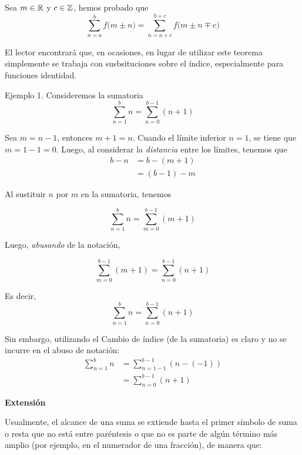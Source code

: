 Sea $m\in \mathbb{R}$ y $c\in \mathbb{Z}$, hemos probado que \[\sum_{n=a}^{b}f\bigl(m\pm n\bigr) = \sum_{n=a+c}^{b+c}f\bigl(m\pm n \mp c\bigr)\]

El lector encontrará que, en ocasiones, en lugar de utilizar este teorema simplemente se trabaja con susbsituciones sobre el índice, especialmente para funciones identidad. 

Ejemplo 1. Consideremos la sumatoria
  \[\sum_{n=1}^{b} n = \sum_{n=0}^{b-1} (n+1)\]
  
  Sea $m=n-1$, entonces $m+1=n$. Cuando el límite inferior $n=1$, se tiene que $m=1-1=0$. Luego, al considerar la \textit{distancia} entre los límites, tenemos que
  \begin{align*}
    b - n &= b - (m+1)\\
    &= (b-1) - m
  \end{align*}
  
  Al sustituir $n$ por $m$ en la sumatoria, tenemos
  
  \[\sum_{n=1}^{b} n = \sum_{m=0}^{b-1} (m+1)\]
  
  Luego, \textit{abusando} de la notación, 
  
  \[\sum_{m=0}^{b-1} (m+1) = \sum_{n=0}^{b-1} (n+1)\]
  
  Es decir, \[\sum_{n=1}^{b} n = \sum_{n=0}^{b-1} (n+1)\]
  
  Sin embargo, utilizando el Cambio de índice (de la sumatoria) es claro y no se incurre en el abuso de notación:
  \begin{align*}
    \sum_{n=1}^{b} n &= \sum_{n=1-1}^{b-1} (n-(-1))\\
    &= \sum_{n=0}^{b-1} (n+1)
  \end{align*}
  
  

\textbf{Extensión}

Usualmente, el alcance de una suma se extiende hasta el primer símbolo de suma o resta que no está entre paréntesis o que no es parte de algún término más amplio (por ejemplo, en el numerador de una fracción), de manera que:

